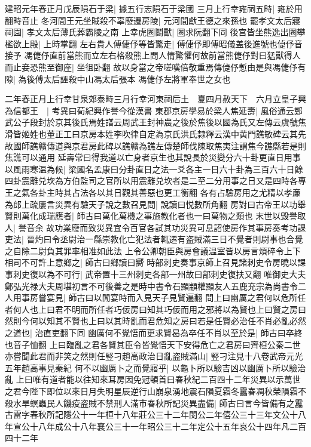建昭元年春正月戊辰隕石于梁|{
	據五行志隕石于梁國}
三月上行幸雍祠五畤|{
	雍於用翻畤音止}
冬河間王元坐賊殺不辜廢遷房陵|{
	元河間獻王德之來孫也}
罷孝文太后寢祠園|{
	孝文太后薄氏葬霸陵之南}
上幸虎圈鬬獸|{
	圈求阮翻下同}
後宫皆坐熊逸出圈攀檻欲上殿|{
	上時掌翻}
左右貴人傅倢伃等皆驚走|{
	傅倢伃即傅昭儀盖後進號也偼伃音接予}
馮倢伃直前當熊而立左右格殺熊上問人情驚懼何故前當熊倢伃對曰猛獸得人而止妾恐熊至御座|{
	坐徂卧翻}
故以身當之帝嗟嘆倍敬重焉傳偼伃慙由是與馮倢伃有隙|{
	為後傅太后誣殺中山馮太后張本}
馮倢伃左將軍奉世之女也

二年春正月上行幸甘泉郊泰畤三月行幸河東祠后土　夏四月赦天下　六月立皇子興為信都王　|{
	考異曰荀紀興作譽今從漢書}
東郡京房學易於梁人焦延壽|{
	風俗通云鄭武公子段封於京其後氏焉姓譜云周武王封神農之後於焦後以國為氏又左傳云虞虢焦滑皆姬姓也董正工曰京房本姓李吹律自定為京氏洪氏隸釋云漢中黄門譙敏碑云其先故國師譙贛傳道與京君房此碑以譙贛為譙左傳楚師伐陳取焦夷注謂焦今譙縣若是則焦譙可以通用}
延壽常曰得我道以亡身者京生也其說長於災變分六十卦更直日用事以風雨寒温為候|{
	梁國名孟康曰分卦直日之法一爻各主一日六十卦為三百六十日餘四卦震離兑坎為方伯監司之官所以用震離兑坎者是二至二分用事之日又是四時各專王之氣各卦主時其占法各以其日觀其善惡也更工衡翻}
各有占驗房用之尤精以孝亷為郎上疏屢言災異有驗天子說之數召見問|{
	說讀曰悦數所角翻}
房對曰古帝王以功舉賢則萬化成瑞應者|{
	師古曰萬化萬機之事施教化者也一曰萬物之類也}
末世以毁譽取人|{
	譽音余}
故功業廢而致災異宜令百官各試其功災異可息詔使房作其事房奏考功課吏法|{
	晉灼曰令丞尉治一縣崇教化亡犯法者輒遷有盗賊滿三日不覺者則尉事也合覺之自除二尉負其罪率相准如此法}
上令公卿朝臣與房會議温室皆以房言煩碎令上下相司不可許上意鄉之|{
	師古曰鄉讀曰嚮}
時部刺史奏事京師上召見諸刺史令房曉以課事刺史復以為不可行|{
	武帝置十三州刺史各部一州故曰部刺史復扶又翻}
唯御史大夫鄭弘光禄大夫周堪初言不可後善之是時中書令石顯顓權顯友人五鹿充宗為尚書令二人用事房嘗宴見|{
	師古曰以閒宴時而入見天子見賢遍翻}
問上曰幽厲之君何以危所任者何人也上曰君不明而所任者巧佞房曰知其巧佞而用之邪將以為賢也上曰賢之房曰然則今何以知其不賢也上曰以其時亂而君危知之房曰若是任賢必治任不肖必亂必然之道也|{
	治直吏翻下同}
幽厲何不覺悟而更求賢曷為卒任不肖以至於是|{
	師古曰卒終也音子恤翻}
上曰臨亂之君各賢其臣令皆覺悟天下安得危亡之君房曰齊桓公秦二世亦嘗聞此君而非笑之然則任竪刁趙高政治日亂盗賊滿山|{
	竪刁注見十八卷武帝元光五年趙高事見秦紀}
何不以幽厲卜之而覺寤乎|{
	以龜卜所以驗吉凶以幽厲卜所以驗治亂}
上曰唯有道者能以往知來耳房因免冠頓首曰春秋紀二百四十二年災異以示萬世之君今陛下即位以來日月失明星辰逆行山崩泉湧地震石隕夏霜冬靁春凋秋榮隕霜不殺水旱螟蟲民人饑疫盗賊不禁刑人滿市春秋所記災異盡備|{
	師古曰言今皆備有之靁古雷字春秋所記隱公十一年桓十八年莊公三十二年閔公二年僖公三十三年文公十八年宣公十八年成公十八年襄公三十一年昭公三十二年定公十五年哀公十四年凡二百四十二年}
